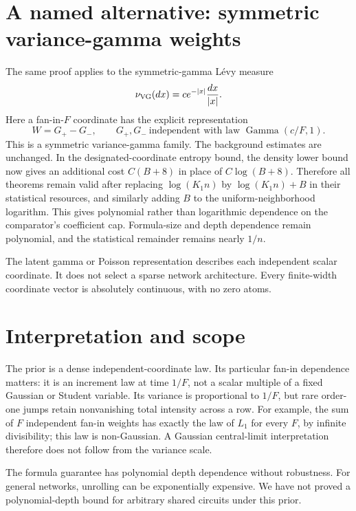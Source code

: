 \documentclass[11pt]{article}
\theoremstyle{remark}\newtheorem{remark}[theorem]{Remark}
\begin{document}











\section{A named alternative: symmetric variance-gamma weights}
The same proof applies to the symmetric-gamma L\'evy measure
\[
 \nu_{\rm VG}(dx)=c e^{-|x|}\frac{dx}{|x|}.
\]
Here a fan-in-$F$ coordinate has the explicit representation
\[
 W=G_+-G_-,\qquad
 G_+,G_-\ \text{independent with law }\operatorname{Gamma}(c/F,1).
\]
This is a symmetric variance-gamma family. The background estimates are unchanged. In the designated-coordinate entropy bound, the density lower bound now gives an additional cost $C(B+8)$ in place of $C\log(B+8)$. Therefore all theorems remain valid after replacing
$\log(K_1 n)$ by $\log(K_1 n)+B$ in their statistical resources, and similarly adding $B$ to the uniform-neighborhood logarithm. This gives polynomial rather than logarithmic dependence on the comparator's coefficient cap. Formula-size and depth dependence remain polynomial, and the statistical remainder remains nearly $1/n$.

The latent gamma or Poisson representation describes each independent scalar coordinate. It does not select a sparse network architecture. Every finite-width coordinate vector is absolutely continuous, with no zero atoms.




\section{Interpretation and scope}
The prior is a dense independent-coordinate law. Its particular fan-in dependence matters: it is an increment law at time $1/F$, not a scalar multiple of a fixed Gaussian or Student variable. Its variance is proportional to $1/F$, but rare order-one jumps retain nonvanishing total intensity across a row. For example, the sum of $F$ independent fan-in weights has exactly the law of $L_1$ for every $F$, by infinite divisibility; this law is non-Gaussian. A Gaussian central-limit interpretation therefore does not follow from the variance scale.

The formula guarantee has polynomial depth dependence without robustness. For general networks, unrolling can be exponentially expensive. We have not proved a polynomial-depth bound for arbitrary shared circuits under this prior.
\end{document}

